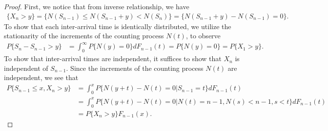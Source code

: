 \documentclass[a4paper,10pt,english]{article}
\begin{document}
\begin{proof} 
First, we notice that from inverse relationship, we have 
\begin{align*}
\{X_{n} > y\} = \{ N(S_{n-1}) \leqslant N(S_{n-1} + y) < N(S_{n})\} = \{N(S_{n-1}+y)-N(S_{n-1}) = 0\}. 
\end{align*}
To show that each inter-arrival time is identically distributed, we utilize the stationarity of the increments of the counting process $N(t)$, to observe 
\begin{align*}
P\{S_n - S_{n-1} > y\} &%
= \int_{0}^{\infty}P\{N(y) = 0\}dF_{n-1}(t) = P\{N(y) = 0\} = P\{X_1 > y\}.
\end{align*}
To show that inter-arrival times are independent, it suffices to show that $X_{n}$ is independent of $S_{n-1}$. 
Since the increments of the counting process $N(t)$ are independent, we see that 
\begin{align*}
P\{S_{n-1} \leqslant x, X_{n} > y\} &%
= \int_{0}^{x}P\{N(y+t) - N(t) = 0|S_{n-1} = t\}dF_{n-1}(t)\\
&= \int_{0}^{x}P\{N(y+t) - N(t) = 0|N(t) = n-1, N(s) < n-1, s < t \}dF_{n-1}(t) \\
&= P\{X_n > y\}F_{n-1}(x).
\end{align*}

\end{proof}
\end{document}
